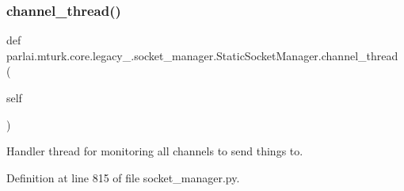 \subsubsection{\texorpdfstring{channel\+\_\+thread()}{channel\_thread()}}
{\footnotesize\ttfamily def parlai.\+mturk.\+core.\+legacy\+\_.\+socket\+\_\+manager.\+Static\+Socket\+Manager.\+channel\+\_\+thread (\begin{DoxyParamCaption}\item[{}]{self }\end{DoxyParamCaption})}

\begin{DoxyVerb}Handler thread for monitoring all channels to send things to.
\end{DoxyVerb}
 

Definition at line 815 of file socket\+\_\+manager.\+py.


